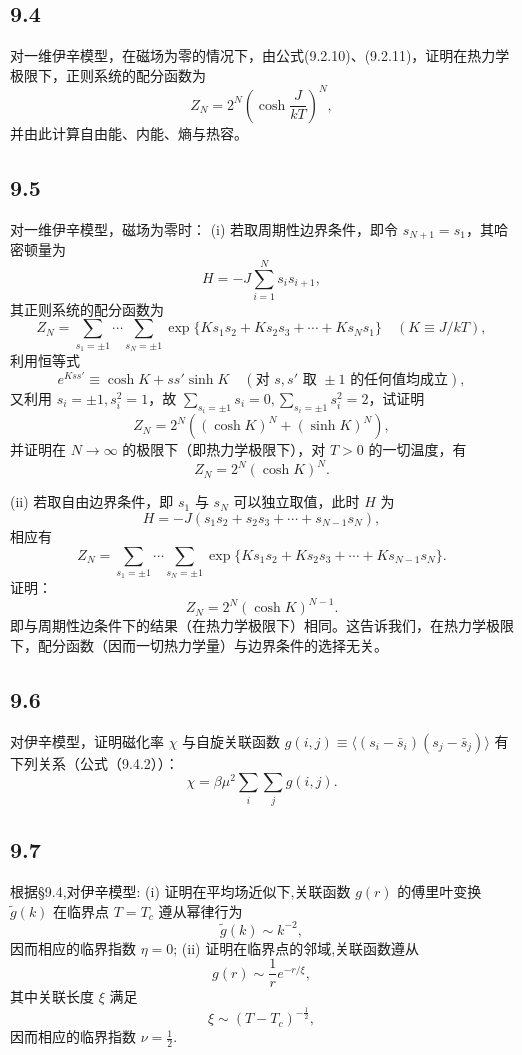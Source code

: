 \newpage
\subsection{9.4}
对一维伊辛模型，在磁场为零的情况下，由公式(9.2.10)、(9.2.11)，证明在热力学极限下，正则系统的配分函数为
$$Z_N = 2^N \left( \cosh \frac{J}{kT} \right)^N,$$
并由此计算自由能、内能、熵与热容。

\newpage
\subsection{9.5}
对一维伊辛模型，磁场为零时：
(i) 若取周期性边界条件，即令 $s_{N+1} = s_1$，其哈密顿量为
$$H = -J \sum_{i=1}^{N} s_i s_{i+1},$$
其正则系统的配分函数为
$$Z_N = \sum_{s_1=\pm 1} \cdots \sum_{s_N=\pm 1} \exp\{K s_1 s_2 + K s_2 s_3 + \cdots + K s_N s_1\} \quad (K \equiv J/kT),$$
利用恒等式
$$e^{K s s'} \equiv \cosh K + s s' \sinh K \quad (\text{对 } s, s' \text{ 取 } \pm 1 \text{ 的任何值均成立}),$$
又利用 $s_i = \pm 1, s_i^2 = 1$，故 $\sum_{s_i = \pm 1} s_i = 0, \sum_{s_i = \pm 1} s_i^2 = 2$，试证明
$$Z_N = 2^N \left( (\cosh K)^N + (\sinh K)^N \right),$$
并证明在 $N \to \infty$ 的极限下（即热力学极限下），对 $T > 0$ 的一切温度，有
$$Z_N = 2^N (\cosh K)^N.$$

(ii) 若取自由边界条件，即 $s_1$ 与 $s_N$ 可以独立取值，此时 $H$ 为
$$H = -J(s_1 s_2 + s_2 s_3 + \cdots + s_{N-1} s_N),$$
相应有
$$Z_N = \sum_{s_1=\pm 1} \cdots \sum_{s_N=\pm 1} \exp\{K s_1 s_2 + K s_2 s_3 + \cdots + K s_{N-1} s_N\}.$$
证明：
$$Z_N = 2^N (\cosh K)^{N-1}.$$
即与周期性边条件下的结果（在热力学极限下）相同。这告诉我们，在热力学极限下，配分函数（因而一切热力学量）与边界条件的选择无关。

\newpage
\subsection{9.6}
对伊辛模型，证明磁化率 $\chi$ 与自旋关联函数 $g(i,j) \equiv \langle (s_i - \bar{s}_i)(s_j - \bar{s}_j) \rangle$ 有下列关系（公式（9.4.2））：
$$\chi = \beta \mu^2 \sum_i \sum_j g(i,j).$$

\newpage
\subsection{9.7}
根据§9.4,对伊辛模型:
(i) 证明在平均场近似下,关联函数 $g(r)$ 的傅里叶变换 $\tilde{g}(k)$ 在临界点 $T = T_c$ 遵从幂律行为
$$\tilde{g}(k) \sim k^{-2},$$
因而相应的临界指数 $\eta = 0$;
(ii) 证明在临界点的邻域,关联函数遵从
$$g(r) \sim \frac{1}{r} e^{-r/\xi},$$
其中关联长度 $\xi$ 满足
$$\xi \sim (T - T_c)^{-\frac{1}{2}},$$
因而相应的临界指数 $\nu = \frac{1}{2}$.